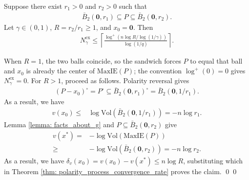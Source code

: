 \documentclass[smallextended]{svjour3}
\let\springerproof\proof
\let\endspringerproof\endproof
\renewenvironment{proof}{\springerproof}{%
  \ifhmode\qed\else\leavevmode\qed\fi\endspringerproof}
\newcommand{\V}{{\mathrm{Vol}}}
\newcommand{\MaxIE}{\mathrm{MaxIE}}
\begin{document}
\begin{corollary}\label{corollary: bounded radius ratio}
    Suppose there exist $r_1 > 0$ and $r_2 > 0$ such that
    \begin{align*}
        \bar{B}_2(\mathbf{0}, r_1) \subseteq P \subseteq \bar{B}_2(\mathbf{0}, r_2).
    \end{align*}
    Let $\gamma\in(0,1)$, $R=r_2/r_1\geq1$, and $x_0=\mathbf{0}$. Then
    \begin{align*}
            N_\gamma^{\mathrm{ex}} \leq \left\lceil
            \frac{\log^+\!\left(n\log R/\log(1/\gamma)\right)}{\log(1/q)}
            \right\rceil.
        \end{align*}
\end{corollary}
\begin{proof}
    When $R=1$, the two balls coincide, so the sandwich forces $P$ to equal
    that ball and $x_0$ is already the center of $\MaxIE(P)$; the convention
    $\log^+(0)=0$ gives $N_\gamma^{\mathrm{ex}}=0$. For $R>1$, proceed as follows.
    Polarity reversal gives
    \begin{align*}
         (P-x_0)^\circ  = P^\circ \subseteq \bar{B}_2(\mathbf{0}, r_1)^\circ = \bar{B}_2(\mathbf{0}, 1/r_1).
    \end{align*}
    As a result, we have 
    \begin{align*}
        v(x_0) \leq &\log \V(\bar{B}_2(\mathbf{0}, 1/r_1)) = -n \log r_1.
    \end{align*}
    Lemma \ref{lemma: facts_about_g} and
    $P\subseteq\bar B_2(\mathbf{0},r_2)$ give
    \begin{align*}
        v(x^*) = & - \log \V(\MaxIE(P)) \\
        \geq & - \log \V( \bar{B}_2(\mathbf{0}, r_2) ) = -n \log r_2.
    \end{align*}
    As a result, we have $\delta_v(x_0) = v(x_0) - v(x^*) \leq n \log R$, substituting which in Theorem \ref{thm: polarity_process_convergence_rate} proves the claim. 
\end{proof}
\end{document}
